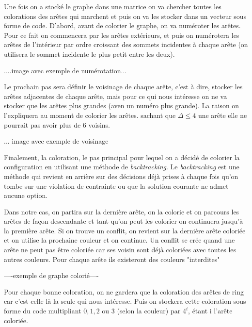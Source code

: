 \documentclass[10pt,a4paper]{article}
\begin{document}



Une fois on a stocké le graphe dans une matrice on va chercher toutes les colorations des arêtes qui marchent et puis on va les stocker dans un vecteur sous forme de code. D'abord, avant de colorier le graphe, on va numéroter les arêtes. Pour ce fait on commencera par les arêtes extérieurs, et puis on numérotera les arêtes de l'intérieur par ordre croissant des sommets incidentes à chaque arête (on utilisera le sommet incidente le plus petit entre les deux).

....image avec exemple de numérotation...

Le prochain pas sera définir le voisinage de chaque arête, c'est à dire, stocker les arêtes adjacentes de chaque arête, mais pour ce qui nous intéresse on ne va stocker que les arêtes plus grandes (aven un numéro plus grande). La raison on l'expliquera au moment de colorier les arêtes. sachant que $\Delta \leq 4$ une arête elle ne pourrait pas avoir plus de 6 voisins.

... image avec exemple de voisinage

Finalement, la coloration, le pas principal pour lequel on a décidé de colorier la configuration en utilisant une méthode de \emph{backtracking}. Le \emph{backtracking} est une méthode qui revient en arrière sur des décisions déjà prises à chaque fois qu'on tombe sur une violation de contrainte ou que la solution courante ne admet aucune option. 

Dans notre cas, on partira sur la dernière arête, on la colorie et on parcours les arêtes de façon descendante et tant qu'on peut les colorier on continuera jusqu'à la première arête. Si on trouve un conflit, on revient sur la dernière arête coloriée et on utilise la prochaine couleur et on continue. Un conflit se crée quand une arête ne peut pas être coloriée car ses voisin sont déjà coloriées avec toutes les autres couleurs. Pour chaque arête ils existeront des couleurs "interdites" 

----exemple de graphe colorié----

Pour chaque bonne coloration, on ne gardera que la coloration des arêtes de ring car c'est celle-là la seule qui nous intéresse. Puis on stockera cette coloration sous forme du code multipliant $0,1,2$ ou $3$ (selon la couleur) par $4^{i}$, étant i l'arête coloriée.
\end{document}
